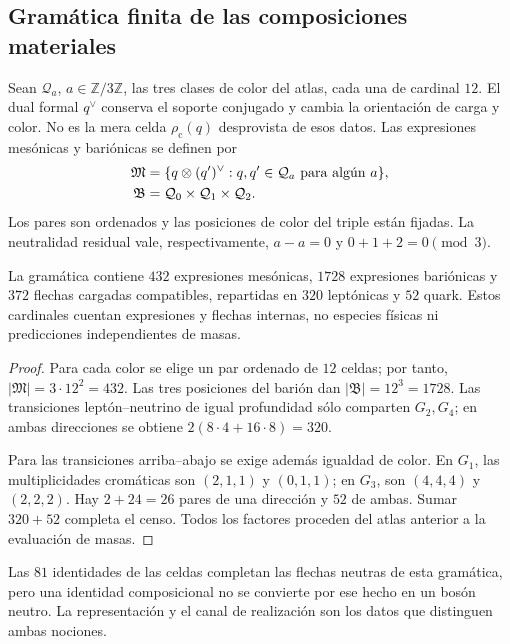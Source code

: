 \subsection{Gramática finita de las composiciones materiales}
\label{vi:vi:subsec:gramatica-compuestos}

Sean \(\mathcal Q_a\), \(a\in\mathbb Z/3\mathbb Z\), las tres
clases de color del atlas, cada una de cardinal \(12\). El dual formal
\(q^\vee\) conserva el soporte conjugado y cambia la orientación de
carga y color. No es la mera celda \(\rho_{\mathrm c}(q)\) desprovista
de esos datos. Las expresiones mesónicas y bariónicas se definen por
\begin{align}
 \mathfrak M&=\{q\otimes(q')^\vee:
 q,q'\in\mathcal Q_a\text{ para algún }a\},\notag\\
 \mathfrak B&=\mathcal Q_0\times\mathcal Q_1\times\mathcal Q_2.
 \label{vi:vi:eq:gramatica-meson-barion}
\end{align}
Los pares son ordenados y las posiciones de color del triple están
fijadas. La neutralidad residual vale, respectivamente,
\(a-a=0\) y \(0+1+2=0\pmod3\).

\begin{proposition}
\label{vi:vi:prop:censo-compuestos}
La gramática contiene \(432\) expresiones mesónicas, \(1728\)
expresiones bariónicas y \(372\) flechas cargadas compatibles, repartidas
en \(320\) leptónicas y \(52\) quark. Estos cardinales cuentan
expresiones y flechas internas, no especies físicas ni predicciones
independientes de masas.
\end{proposition}
\begin{proof}
Para cada color se elige un par ordenado de \(12\) celdas; por tanto,
\(|\mathfrak M|=3\cdot12^2=432\). Las tres posiciones del barión dan
\(|\mathfrak B|=12^3=1728\). Las transiciones leptón--neutrino de
igual profundidad sólo comparten \(G_2,G_4\); en ambas direcciones se
obtiene \(2(8\cdot4+16\cdot8)=320\).

Para las transiciones arriba--abajo se exige además igualdad de color.
En \(G_1\), las multiplicidades cromáticas son \((2,1,1)\) y
\((0,1,1)\); en \(G_3\), son \((4,4,4)\) y \((2,2,2)\).
Hay \(2+24=26\) pares de una dirección y \(52\) de ambas. Sumar
\(320+52\) completa el censo. Todos los factores proceden del atlas
anterior a la evaluación de masas.
\end{proof}

Las \(81\) identidades de las celdas completan las flechas neutras
de esta gramática, pero una identidad composicional no se convierte por
ese hecho en un bosón neutro. La representación y el canal de realización
son los datos que distinguen ambas nociones.

